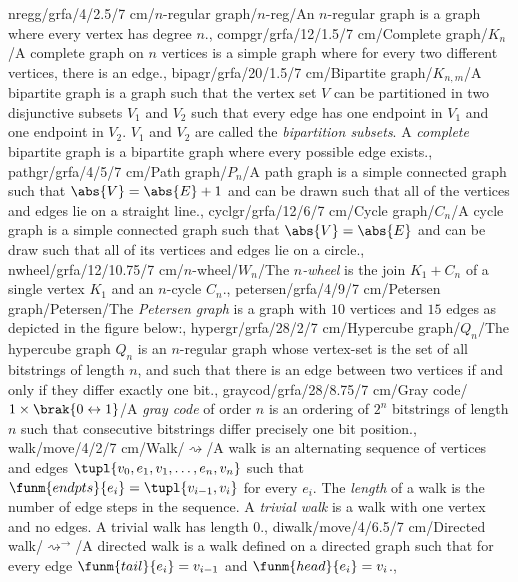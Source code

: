 nregg/grfa/4/2.5/7 cm/{$n$-regular graph}/{$n$-reg}/{An $n$-regular graph is a graph where every vertex has degree $n$.},%
compgr/grfa/12/1.5/7 cm/{Complete graph}/{$K_n$}/{A complete graph on $n$ vertices is a simple graph where for every two different vertices, there is an edge.},%
bipagr/grfa/20/1.5/7 cm/{Bipartite graph}/{$K_{n,m}$}/{A bipartite graph is a graph such that the vertex set $V$ can be partitioned in two disjunctive subsets $V_1$ and $V_2$ such that every edge has one endpoint in $V_1$ and one endpoint in $V_2$. $V_1$ and $V_2$ are called the \emph{bipartition subsets}. A \emph{complete} bipartite graph is a bipartite graph where every possible edge exists.},%
pathgr/grfa/4/5/7 cm/{Path graph}/{$P_n$}/{A path graph is a simple connected graph such that $\abs{V}=\abs{E}+1$ and can be drawn such that all of the vertices and edges lie on a straight line.},%
cyclgr/grfa/12/6/7 cm/{Cycle graph}/{$C_n$}/{A cycle graph is a simple connected graph such that $\abs{V}=\abs{E}$ and can be draw such that all of its vertices and edges lie on a circle.},%
nwheel/grfa/12/10.75/7 cm/{$n$-wheel}/{$W_n$}/{The \emph{$n$-wheel} is the join $K_1+C_n$ of a single vertex $K_1$ and an $n$-cycle $C_n$.},%
petersen/grfa/4/9/7 cm/{Petersen graph}/{Petersen}/{The \emph{Petersen graph} is a graph with $10$ vertices and $15$ edges as depicted in the figure below:},
hypergr/grfa/28/2/7 cm/{Hypercube graph}/{$Q_n$}/{The hypercube graph $Q_n$ is an $n$-regular graph whose vertex-set is the set of all bitstrings of length $n$, and such that there is an edge between two vertices if and only if they differ exactly one bit.},%
graycod/grfa/28/8.75/7 cm/{Gray code}/{$1\times \brak{0\leftrightarrow 1}$}/{A \emph{gray code} of order $n$ is an ordering of $2^n$ bitstrings of length $n$ such that consecutive bitstrings differ precisely one bit position.},%
walk/move/4/2/7 cm/{Walk}/{$\rightsquigarrow$}/{A walk is an alternating sequence of vertices and edges $\tupl{v_0,e_1,v_1,\ldots,e_n,v_n}$ such that $\funm{endpts}{e_i}=\tupl{v_{i-1},v_i}$ for every $e_i$. The \emph{length} of a walk is the number of edge steps in the sequence. A \emph{trivial walk} is a walk with one vertex and no edges. A trivial walk has length $0$.},%
diwalk/move/4/6.5/7 cm/{Directed walk}/{$\rightsquigarrow^{\rightarrow}$}/{A directed walk is a walk defined on a directed graph such that for every edge $\funm{tail}{e_i}=v_{i-1}$ and $\funm{head}{e_i}=v_i$.},
